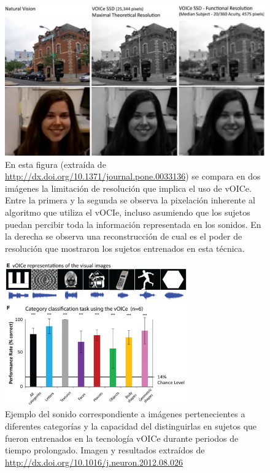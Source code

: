 \documentclass{article}
\numberwithin{figure}{section}
\begin{document}
    \begin{figure}
        \center
        \includegraphics[width=\textwidth]{Imagenes/ImagenVoice1.png}
        \caption{En esta figura (extraída de \url{http://dx.doi.org/10.1371/journal.pone.0033136}) se compara en dos imágenes la limitación de resolución que implica el uso de vOICe. Entre la primera y la segunda se observa la pixelación inherente al algoritmo que utiliza el vOCIe, incluso asumiendo que los sujetos puedan percibir toda la información representada en los sonidos. En la derecha se observa una reconstrucción de cual es el poder de resolución que mostraron los sujetos entrenados en esta técnica.}    
        \label{fig:Voice1}
    \end{figure}

    \begin{figure}
        \center
        \includegraphics[width=0.7\textwidth]{Imagenes/Voice3.png}
        \caption{Ejemplo del sonido correspondiente a imágenes pertenecientes a diferentes categorías y la capacidad del distinguirlas en sujetos que fueron entrenados en la tecnología vOICe durante periodos de tiempo prolongado. Imagen y resultados extraídos de \url{http://dx.doi.org/10.1016/j.neuron.2012.08.026}}
        \label{fig:Voice3}
    \end{figure}
    
\end{document}

